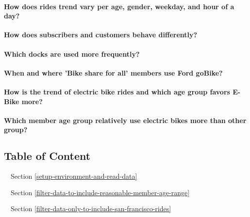 \documentclass[11pt]{article}
\begin{document}
\paragraph{How does rides trend vary per age, gender, weekday, and hour
of a
day?}\label{how-does-rides-trend-vary-per-age-gender-weekday-and-hour-of-a-day}

\paragraph{How does subscribers and customers behave
differently?}\label{how-does-subscribers-and-customers-behave-differently}

\paragraph{Which docks are used more
frequently?}\label{which-docks-are-used-more-frequently}

\paragraph{When and where 'Bike share for all' members use Ford
goBike?}\label{when-and-where-bike-share-for-all-members-use-ford-gobike}

\paragraph{How is the trend of electric bike rides and which age group
favors E-Bike
more?}\label{how-is-the-trend-of-electric-bike-rides-and-which-age-group-favors-e-bike-more}

\paragraph{Which member age group relatively use electric bikes more
than other
group?}\label{which-member-age-group-relatively-use-electric-bikes-more-than-other-group}

    \subsection{Table of Content}\label{table-of-content}

     Section \ref{setup-environment-and-read-data}

 Section \ref{filter-data-to-include-reasonable-member-age-range}

 Section \ref{filter-data-only-to-include-san-francisco-rides}
\end{document}

